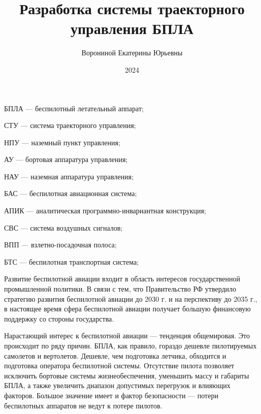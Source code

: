 \documentclass[nir, och, master]{SCWorks}
\begin{document}
\title{Разработка системы траекторного управления БПЛА}
\author{Ворониной Екатерины Юрьевны}
\date{2024}

\maketitle

\tableofcontents

\abbreviations
\begin{description}
	\item БПЛА --- беспилотный летательный аппарат;
	\item СТУ --- система траекторного управления;
	\item НПУ --- наземный пункт управления;
	\item АУ --- бортовая аппаратура управления;
	\item НАУ --- наземная аппаратура управления;
	\item БАС --- беспилотная авиационная система;
	\item АПИК --- аналитическая программно-инвариантная конструкция;
	\item СВС --- система воздушных сигналов;
	\item ВПП --- взлетно-посадочная полоса;
	\item БТС --- беспилотная транспортная система;
\end{description}

\intro
Развитие беспилотной авиации входит в область интересов государственной промышленной политики. 
В связи с тем, что  Правительство РФ \cite{rasporyazhenie} утвердило стратегию развития беспилотной авиации до 2030 г. 
и на перспективу до 2035 г., в настоящее время сфера беспилотной авиации получает большую финансовую поддержку со стороны государства.

Нарастающий интерес к беспилотной авиации --- тенденция общемировая. Это происходит по ряду 
причин. БПЛА, как правило, гораздо дешевле пилотируемых самолетов и вертолетов. Дешевле, чем 
подготовка летчика, обходится и подготовка оператора беспилотной системы. Отсутствие пилота 
позволяет исключить бортовые системы жизнеобеспечения, уменьшить массу и габариты БПЛА, 
а также увеличить диапазон допустимых перегрузок и влияющих факторов. Большое значение имеет 
и фактор безопасности — потери беспилотных аппаратов не ведут к потере пилотов.
\end{document}
